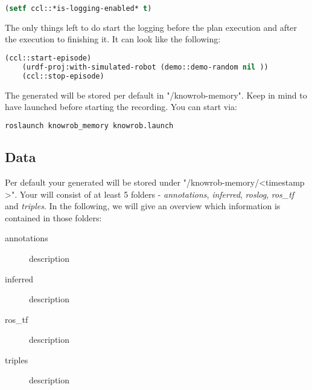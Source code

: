 \begin{lstlisting}[language=lisp, caption=Enabling \neem Logging in a \cram plan]
	(setf ccl::*is-logging-enabled* t)
\end{lstlisting}

The only things left to do start the logging before the plan execution and after the execution to finishing it. 
It can look like the following:
\begin{lstlisting}[language=lisp, caption=Steps to Record an Episode for a \cram Plan]
	(ccl::start-episode)
	(urdf-proj:with-simulated-robot (demo::demo-random nil ))
	(ccl::stop-episode)
\end{lstlisting}
	
The generated \neem will be stored per default in "\raisebox{-0.9ex}{\~{}}/knowrob-memory".
Keep in mind to  have \knowrob launched before starting the \neem recording. 
You can start \knowrob via:

\begin{lstlisting}[language=bash, caption=How to Start \knowrob]
	roslaunch knowrob_memory knowrob.launch
\end{lstlisting}

\subsection{Data}
Per  default your generated \neem will be stored under "\raisebox{-0.9ex}{\~{}}/knowrob-memory/\textless timestamp \textgreater". 
Your \neem will consist of at least 5 folders - \textit{annotations}, \textit{inferred}, \textit{roslog}, \textit{ros\_tf} and \textit{triples}.
In the following, we will give an overview which information is contained in those folders:

\begin{description}
	\item[annotations] description
	\item[inferred] description
	\item[ros\_tf] description
	\item[triples] description	
\end{description}


